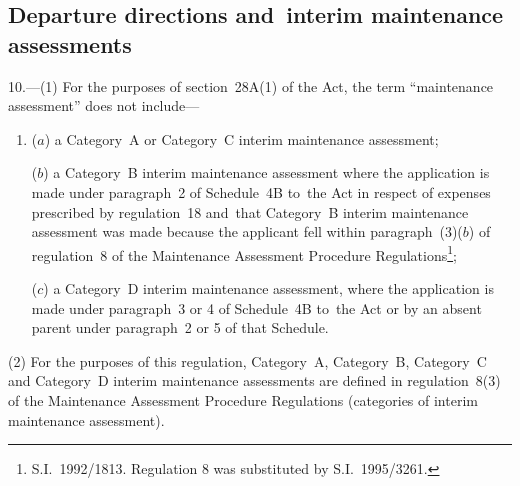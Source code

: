 \documentclass[12pt,a4paper]{article}
\begin{document}
\subsection[10. Departure directions and~interim maintenance assessments]{Departure directions and~interim maintenance assessments}

10.—(1) For the purposes
of section~28A(1) of the Act, the term “maintenance assessment” does not
include—
\begin{enumerate}\item[]
($a$) a Category~A or Category~C interim maintenance assessment;

($b$) a Category~B interim maintenance assessment where the application is made
under paragraph~2 of Schedule~4B to~the Act in respect of expenses prescribed by
regulation~18 and~that Category~B interim maintenance assessment was made
because the applicant fell within paragraph~(3)($b$) of regulation~8 of the
Maintenance Assessment Procedure Regulations\footnote{\frenchspacing S.I.~1992/1813. Regulation 8 was substituted by S.I.~1995/3261.};

($c$) a Category~D interim maintenance assessment, where the application is made
under paragraph~3 or 4 of Schedule~4B to~the Act or by an absent parent under
paragraph~2 or 5 of that Schedule.
\end{enumerate}

(2) For the purposes of this regulation, Category~A, Category~B, Category~C and
Category~D interim maintenance assessments are defined in regulation~8(3) of the
Maintenance Assessment Procedure Regulations (categories of interim maintenance
assessment).


%
%
\end{document}
